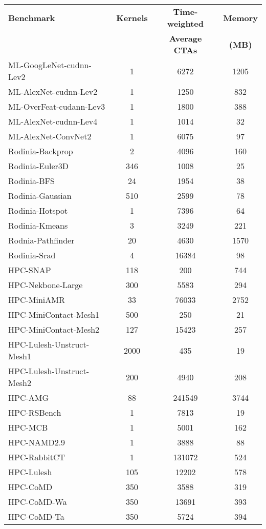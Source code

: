 \begin{table}[t]
\begin{small}
\centering
\begin{tabular}{lccc}
 \toprule
 \textbf{Benchmark} & \textbf{Kernels} & \textbf{Time-weighted} & \textbf{Memory} \\
& & \textbf{Average CTAs} & \textbf{(MB)} \\
 \toprule
ML-GoogLeNet-cudnn-Lev2 & 1 & 6272 & 1205 \\
ML-AlexNet-cudnn-Lev2 & 1 & 1250 & 832 \\
ML-OverFeat-cudann-Lev3 & 1 & 1800 & 388 \\
ML-AlexNet-cudnn-Lev4 & 1 & 1014 & 32 \\
ML-AlexNet-ConvNet2 & 1 & 6075 & 97 \\
Rodinia-Backprop & 2 & 4096 & 160 \\
Rodinia-Euler3D & 346 & 1008 & 25 \\
Rodinia-BFS & 24 & 1954 & 38 \\
Rodinia-Gaussian & 510 & 2599 & 78 \\
Rodinia-Hotspot & 1 & 7396 & 64 \\
Rodinia-Kmeans & 3 & 3249 & 221 \\
Rodnia-Pathfinder & 20 & 4630 & 1570 \\
Rodinia-Srad & 4 & 16384 & 98 \\
HPC-SNAP & 118 & 200 & 744 \\
HPC-Nekbone-Large & 300 & 5583 & 294 \\
HPC-MiniAMR & 33 & 76033 & 2752 \\
HPC-MiniContact-Mesh1 & 500 & 250 & 21 \\
HPC-MiniContact-Mesh2 & 127 & 15423 & 257 \\
HPC-Lulesh-Unstruct-Mesh1 & 2000 & 435 & 19 \\
HPC-Lulesh-Unstruct-Mesh2 & 200 & 4940 & 208 \\
HPC-AMG & 88 & 241549 & 3744 \\
HPC-RSBench & 1 & 7813 & 19 \\
HPC-MCB & 1 & 5001 & 162 \\
HPC-NAMD2.9 & 1 & 3888 & 88 \\
HPC-RabbitCT & 1 & 131072 & 524 \\
HPC-Lulesh & 105 & 12202 & 578 \\
HPC-CoMD & 350 & 3588 & 319 \\
HPC-CoMD-Wa & 350 & 13691 & 393 \\
HPC-CoMD-Ta & 350 & 5724 & 394 \\

\end{tabular}
\end{small}
\end{table}
